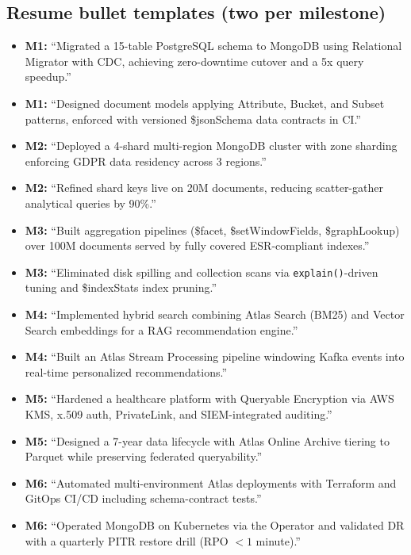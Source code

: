 \documentclass[11pt, a4paper]{article}
\begin{document}
\subsection*{Resume bullet templates (two per milestone)}
\begin{itemize}[label=-]
    \item \textbf{M1:} ``Migrated a 15-table PostgreSQL schema to MongoDB using Relational Migrator with CDC, achieving zero-downtime cutover and a 5x query speedup.''
    \item \textbf{M1:} ``Designed document models applying Attribute, Bucket, and Subset patterns, enforced with versioned \$jsonSchema data contracts in CI.''
    \item \textbf{M2:} ``Deployed a 4-shard multi-region MongoDB cluster with zone sharding enforcing GDPR data residency across 3 regions.''
    \item \textbf{M2:} ``Refined shard keys live on 20M documents, reducing scatter-gather analytical queries by 90\%.''
    \item \textbf{M3:} ``Built aggregation pipelines (\$facet, \$setWindowFields, \$graphLookup) over 100M documents served by fully covered ESR-compliant indexes.''
    \item \textbf{M3:} ``Eliminated disk spilling and collection scans via \texttt{explain()}-driven tuning and \$indexStats index pruning.''
    \item \textbf{M4:} ``Implemented hybrid search combining Atlas Search (BM25) and Vector Search embeddings for a RAG recommendation engine.''
    \item \textbf{M4:} ``Built an Atlas Stream Processing pipeline windowing Kafka events into real-time personalized recommendations.''
    \item \textbf{M5:} ``Hardened a healthcare platform with Queryable Encryption via AWS KMS, x.509 auth, PrivateLink, and SIEM-integrated auditing.''
    \item \textbf{M5:} ``Designed a 7-year data lifecycle with Atlas Online Archive tiering to Parquet while preserving federated queryability.''
    \item \textbf{M6:} ``Automated multi-environment Atlas deployments with Terraform and GitOps CI/CD including schema-contract tests.''
    \item \textbf{M6:} ``Operated MongoDB on Kubernetes via the Operator and validated DR with a quarterly PITR restore drill (RPO $<1$ minute).''
\end{itemize}
\end{document}

